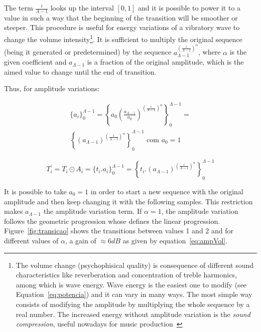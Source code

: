\documentclass[
 aip,
 jmp,
 amsmath,amssymb,
 reprint,
]{revtex4-1}
\begin{document}
The term $\frac{i}{\Lambda-1}$ looks up the interval $[0,1]$ and it is possible to power it to a value in such a way that the beginning of the transition will be smoother or steeper.
This procedure is useful for energy variations of a vibratory wave to change the volume intensity\footnote{The volume change (psychophisical quality) is consequence of different sound characteristics like reverberation and concentration of treble harmonics, among which is wave energy. Wave energy is the easiest one to modify (see Equation~\ref{eq:potencia}) and it can vary in many ways. The most simple way consists of modifying the amplitude by multiplying the whole sequence by a real number. The increased energy without amplitude variation is the \emph{sound compression}, useful nowadays for music production~\cite{guillaume}}. It is sufficient to multiply the original sequence (being it generated or predetermined) by the sequence $a_{\Lambda-1}^{\left( \frac{i}{\Lambda-1} \right )^\alpha}$, where $\alpha$ is the given coefficient and $a_{\Lambda-1}$ is a fraction of the original amplitude, which is the aimed value to change until the end of transition.

Thus, for amplitude variations:

\begin{multline}\label{seqAmp}
 \{a_i\}_0^{\Lambda-1}=\left \{ a_0 \left ( \frac{a_{\Lambda-1}}{a_0} \right )^{\left ( \frac{i}{\Lambda-1} \right )^\alpha} \right \}_0^{\Lambda-1}= \\ \left \{ \left ( {a_{\Lambda-1}} \right )^{\left ( \frac{i}{\Lambda-1} \right )^\alpha} \right \}_0^{\Lambda-1} \text{ com } a_0=1
\end{multline}

\begin{equation}\label{transAmp}
 T_i^{'}=T_i \odot A_i = \{t_i . a_i\}_0^{\Lambda-1}=\left \{ t_i . (a_{\Lambda-1} )^{\left ( \frac{i}{\Lambda-1} \right )^\alpha} \right \}_0^{\Lambda-1}
\end{equation}

It is possible to take $a_0=1$ in order to start a new sequence with the original amplitude and then keep changing it with the following samples.
This restriction makes $a_{\Lambda-1}$ the amplitude variation term.
If $\alpha=1$, the amplitude variation follows the geometric progression whose defines the linear progression. Figure~\ref{fig:transicao} shows the transitions between values 1 and 2 and for different values of $\alpha$, a gain of $\approx 6dB$ as given by equation~\ref{eq:ampVol}.
\end{document}
